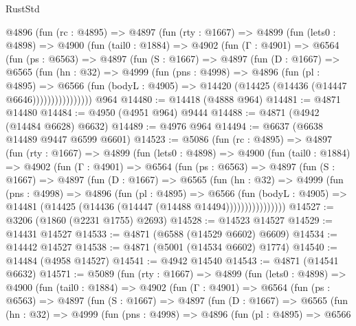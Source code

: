 \begin{lexlean}{RustStd}
\begin{coremodule}
{\begin{coremodule}
{{{{{{{{{{{{{{{{{{{{{{{{{{{{{    @4896
      (fun (rc : @4895) =>
      @4897
        (fun (rty : @1667) =>
        @4899
          (fun (lets0 : @4898) =>
          @4900
            (fun (tail0 : @1884) =>
            @4902
              (fun (Γ : @4901) =>
              @6564
                (fun (ps : @6563) =>
                @4897
                  (fun (S : @1667) =>
                  @4897
                    (fun (D : @1667) =>
                    @6565
                      (fun (hn : @32) =>
                      @4999
                        (fun (pns : @4998) =>
                        @4896
                          (fun (pl : @4895) =>
                          @6566
                            (fun (bodyL : @4905) =>
                            @14420 (@14425 (@14436 (@14447 @6646))))))))))))))))
    @964
@14480 := @14418 (@4888 @964)
@14481 := @4871 @14480
@14484 := @4950 (@4951 @964) @9444
@14488 := @4871 (@4942 (@14484 @6628) @6632)
@14489 := @4976 @964
@14494 := @6637 (@6638 @14489 @9447 @6599 @6601)
@14523 := @5086
    (fun (rc : @4895) =>
    @4897
      (fun (rty : @1667) =>
      @4899
        (fun (lets0 : @4898) =>
        @4900
          (fun (tail0 : @1884) =>
          @4902
            (fun (Γ : @4901) =>
            @6564
              (fun (ps : @6563) =>
              @4897
                (fun (S : @1667) =>
                @4897
                  (fun (D : @1667) =>
                  @6565
                    (fun (hn : @32) =>
                    @4999
                      (fun (pns : @4998) =>
                      @4896
                        (fun (pl : @4895) =>
                        @6566
                          (fun (bodyL : @4905) =>
                          @14481 (@14425 (@14436 (@14447 (@14488 @14494))))))))))))))))
@14527 := @3206 (@1860 (@2231 @1755) @2693)
@14528 := @14523 @14527
@14529 := @14431 @14527
@14533 := @4871 (@6588 (@14529 @6602) @6609)
@14534 := @14442 @14527
@14538 := @4871 (@5001 (@14534 @6602) @1774)
@14540 := @14484 (@4958 @14527)
@14541 := @4942 @14540
@14543 := @4871 (@14541 @6632)
@14571 := @5089
    (fun (rty : @1667) =>
    @4899
      (fun (lets0 : @4898) =>
      @4900
        (fun (tail0 : @1884) =>
        @4902
          (fun (Γ : @4901) =>
          @6564
            (fun (ps : @6563) =>
            @4897
              (fun (S : @1667) =>
              @4897
                (fun (D : @1667) =>
                @6565
                  (fun (hn : @32) =>
                  @4999
                    (fun (pns : @4998) =>
                    @4896
                      (fun (pl : @4895) =>
                      @6566
}}}}}}}}}}}}}}}}}}}}}}}}}}}}}
\end{coremodule}}
\end{coremodule}
\end{lexlean}

